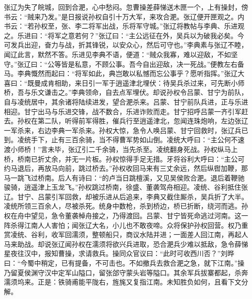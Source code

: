 张辽为失了皖城，回到合淝，心中愁闷。忽曹操差薛悌送木匣一个，上有操封，傍书云：“贼来乃发。”是日报说孙权自引十万大军，来攻合淝。张辽便开匣观之。内书云：“若孙权至，张、李二将军出战，乐将军守城。”张辽将教帖与李典、乐进观之。乐进曰：“将军之意若何？”张辽曰：“主公远征在外，吴兵以为破我必矣。今可发兵出迎，奋力与战，折其锋锐，以安众心，然后可守也。”李典素与张辽不睦，闻辽此言，默然不答。乐进见李典不语，便道：“贼众我寡，难以迎敌，不如坚守。”张辽曰：“公等皆是私意，不顾公事。吾今自出迎敌，决一死战。”便教左右备马。李典慨然而起曰：“将军如此，典岂敢以私憾而忘公事乎？愿听指挥。”张辽大喜曰：“既曼成肯相助，来日引一军于逍遥津北埋伏：待吴兵杀过来，可先断小师桥，吾与乐文谦击之。”李典领命，自去点军埋伏。却说孙权令吕蒙、甘宁为前队，自与凌统居中，其余诸将陆续进发，望合淝杀来。吕蒙、甘宁前队兵进，正与乐进相迎。甘宁出马与乐进交锋，战不数合，乐进诈败而走。甘宁招呼吕蒙一齐引军赶去。孙权在第二队，听得前军得胜，催兵行至逍遥津北，忽闻连珠炮响，左边张辽一军杀来，右边李典一军杀来。孙权大惊，急令人唤吕蒙、甘宁回救时，张辽兵已到。凌统手下，止有三百余骑，当不得曹军势如山倒。凌统大呼曰：“主公何不速渡小师桥！”言未毕，张辽引二千余骑，当先杀至。凌统翻身死战。孙权纵马上桥，桥南已折丈余，并无一片板。孙权惊得手足无措。牙将谷利大呼曰：“主公可约马退后，再放马向前，跳过桥去。”孙权收回马来有三丈余远，然后纵辔加鞭，那马一跳飞过桥南。后人有诗曰：“的卢当日跳檀溪，又见吴侯败合淝。退后着鞭驰骏骑，逍遥津上玉龙飞。”孙权跳过桥南，徐盛、董袭驾舟相迎。凌统、谷利抵住张辽。甘宁、吕蒙引军回救，却被乐进从后追来，李典又截住厮杀，吴兵折了大半。凌统所领三百余人，尽被杀死。统身中数枪，杀到桥边，桥已折断，绕河而逃。孙权在舟中望见，急令董袭棹舟接之，乃得渡回。吕蒙、甘宁皆死命逃过河南。这一阵杀得江南人人害怕；闻张辽大名，小儿也不敢夜啼。众将保护孙权回营。权乃重赏凌统、谷利，收军回濡须，整顿船只，商议水陆并进；一面差人回江南，再起人马来助战。却说张辽闻孙权在濡须将欲兴兵进取，恐合淝兵少难以抵敌，急令薛悌星夜往汉中，报知曹操，求请救兵。操同众官议曰：“此时可收西川否？”刘晔曰：“今蜀中稍定，已有提备，不可击也。不如撤兵去救合淝之急，就下江南。”操乃留夏侯渊守汉中定军山隘口，留张郃守蒙头岩等隘口。其余军兵拔寨都起，杀奔濡须坞来。正是：铁骑甫能平陇右，旌旄又复指江南。未知胜负如何，且看下文分解。